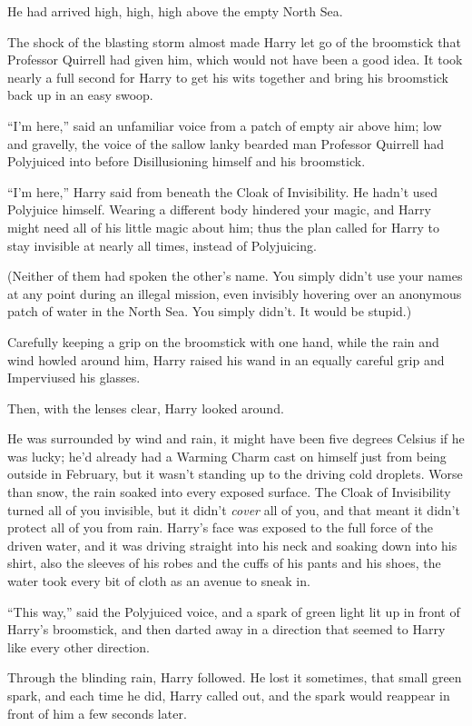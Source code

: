 He had arrived high, high, high above the empty North Sea.

The shock of the blasting storm almost made Harry let go of the
broomstick that Professor Quirrell had given him, which would not have
been a good idea. It took nearly a full second for Harry to get his wits
together and bring his broomstick back up in an easy swoop.

``I'm here,'' said an unfamiliar voice from a patch of empty air above
him; low and gravelly, the voice of the sallow lanky bearded man
Professor Quirrell had Polyjuiced into before Disillusioning himself and
his broomstick.

``I'm here,'' Harry said from beneath the Cloak of Invisibility. He
hadn't used Polyjuice himself. Wearing a different body hindered your
magic, and Harry might need all of his little magic about him; thus the
plan called for Harry to stay invisible at nearly all times, instead of
Polyjuicing.

(Neither of them had spoken the other's name. You simply didn't use your
names at any point during an illegal mission, even invisibly hovering
over an anonymous patch of water in the North Sea. You simply didn't. It
would be stupid.)

Carefully keeping a grip on the broomstick with one hand, while the rain
and wind howled around him, Harry raised his wand in an equally careful
grip and Imperviused his glasses.

Then, with the lenses clear, Harry looked around.

He was surrounded by wind and rain, it might have been five degrees
Celsius if he was lucky; he'd already had a Warming Charm cast on
himself just from being outside in February, but it wasn't standing up
to the driving cold droplets. Worse than snow, the rain soaked into
every exposed surface. The Cloak of Invisibility turned all of you
invisible, but it didn't \emph{cover} all of you, and that meant it
didn't protect all of you from rain. Harry's face was exposed to the
full force of the driven water, and it was driving straight into his
neck and soaking down into his shirt, also the sleeves of his robes and
the cuffs of his pants and his shoes, the water took every bit of cloth
as an avenue to sneak in.

``This way,'' said the Polyjuiced voice, and a spark of green light lit
up in front of Harry's broomstick, and then darted away in a direction
that seemed to Harry like every other direction.

Through the blinding rain, Harry followed. He lost it sometimes, that
small green spark, and each time he did, Harry called out, and the spark
would reappear in front of him a few seconds later.

